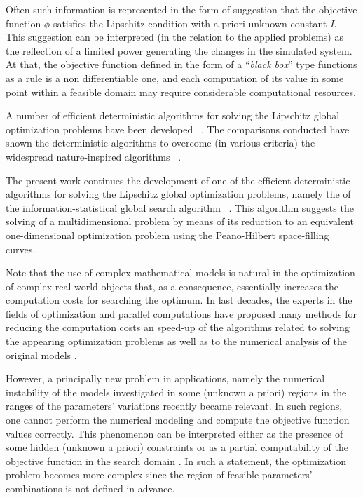 \documentclass[runningheads]{llncs}
\begin{document}
Often such information is represented in the form of suggestion that the objective function $\phi$ satisfies the Lipschitz condition with a priori unknown constant $L$.
This suggestion can be interpreted (in the relation to the applied problems) as the reflection of a limited power generating the changes in the simulated system. At that, the objective function defined in the form of a ``\textit{black box}'' type functions as a rule is a non differentiable one, and each computation of its value in some point within a feasible domain may require considerable computational resources.

A number of efficient deterministic algorithms for solving the Lipschitz global optimization problems have been developed ~\cite{Grishagin2018,Jones2021,Birect2020,PaulaviciusZilinskas2014,Sergeyev2017}. The comparisons conducted have shown the deterministic algorithms to overcome (in various criteria) the widespread nature-inspired algorithms ~\cite{Liberti2005,Sergeyev2018}.

The present work continues the development of one of the efficient deterministic algorithms for solving the Lipschitz global optimization problems, namely the of the information-statistical global search algorithm ~\cite{Strongin2000,Sergeyev2013}. This algorithm suggests the solving of a multidimensional problem by means of its reduction to an equivalent one-dimensional optimization problem using the Peano-Hilbert space-filling curves. 

Note that the use of complex mathematical models is natural in the optimization of complex real world objects that, as a consequence, essentially increases the computation costs for searching the optimum. In last decades, the experts in the fields of optimization and parallel computations have proposed many methods for reducing the computation costs an speed-up of the algorithms related to solving the appearing optimization problems \cite{Kvasov2013,Sergeyev2020} as well as to the numerical analysis of the original models \cite{Dongarra2022,Duwe2020}.

However, a principally new problem in applications, namely the numerical instability of the models investigated in some (unknown a priori) regions in the ranges of the parameters’ variations recently became relevant. In such regions, one cannot perform the numerical modeling and compute the objective function values correctly. This phenomenon can be interpreted either as the presence of some hidden (unknown a priori) constraints \cite{Stripinis2021} or as a partial computability of the objective function in the search domain \cite{Candelieri2019,Sergeyev2003,Strongin2020}. In such a statement, the optimization problem becomes more complex since the region of feasible parameters' combinations is not defined in advance.
\end{document}

